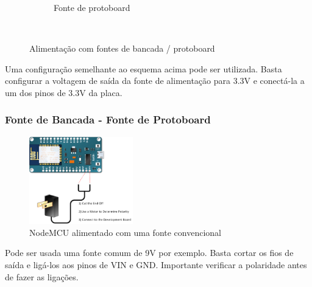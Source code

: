\documentclass{beamer}
\begin{document}
\begin{frame}
\begin{minipage}{\textwidth}
\begin{figure}
\begin{subfigure}[b]{0.25\textwidth}
			\caption{Fonte de protoboard}
			\label{fig:nodefdf_mcu}
		\end{subfigure}
		~ %
		\caption{Alimentação com fontes de bancada / protoboard}\label{fig:placa_dfdiot}
		\vspace{-20pt}
	\end{figure}
	Uma configuração semelhante ao esquema acima pode ser utilizada. Basta configurar a voltagem de saída da fonte de alimentação para 3.3V e conectá-la a um dos pinos de 3.3V da placa.
	
\end{minipage}
\end{frame} 


\begin{frame}
\frametitle{Fonte de Bancada - Fonte de Protoboard}
\begin{minipage}{\textwidth}
	\begin{figure}[!ht]
		\centering
		\includegraphics[width=0.4\textwidth]{ESP-12E-Powered-by-Wall-Wart.png}
		\caption{NodeMCU alimentado com uma fonte convencional}
		\label{fig:aligfgfmentacdffdao_usb}
	\end{figure}
	
	Pode ser usada uma fonte comum de 9V por exemplo. Basta cortar os fios de saída e ligá-los aos pinos de VIN e GND. Importante verificar a polaridade antes de fazer as ligações.
\end{minipage}
\end{frame} 
\end{document}
